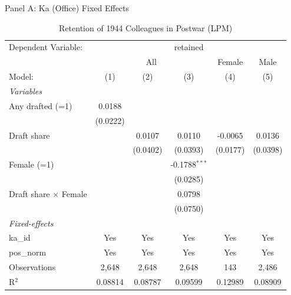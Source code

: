 \begin{table}[htbp]
\centering
\begin{threeparttable}
\caption{Retention of 1944 Colleagues in Postwar (LPM)}
\label{tab:retention}
\small
Panel A: Ka (Office) Fixed Effects\\[1ex]
\begingroup
\centering
\begin{tabular}{lccccc}
   \tabularnewline \midrule \midrule
   Dependent Variable: & \multicolumn{5}{c}{retained}\\
    & \multicolumn{3}{c}{All} & Female & Male \\ 
   Model:                       & (1)      & (2)      & (3)             & (4)      & (5)\\  
   \midrule
   \emph{Variables}\\
   Any drafted (=1)             & 0.0188   &          &                 &          &   \\   
                                & (0.0222) &          &                 &          &   \\   
   Draft share                  &          & 0.0107   & 0.0110          & -0.0065  & 0.0136\\   
                                &          & (0.0402) & (0.0393)        & (0.0177) & (0.0398)\\   
   Female (=1)                  &          &          & -0.1788$^{***}$ &          &   \\   
                                &          &          & (0.0285)        &          &   \\   
   Draft share $\times$ Female  &          &          & 0.0798          &          &   \\   
                                &          &          & (0.0750)        &          &   \\   
   \midrule
   \emph{Fixed-effects}\\
   ka\_id                       & Yes      & Yes      & Yes             & Yes      & Yes\\  
   pos\_norm                    & Yes      & Yes      & Yes             & Yes      & Yes\\  
   \midrule
   Observations                 & 2,648    & 2,648    & 2,648           & 143      & 2,486\\  
   R$^2$                        & 0.08814  & 0.08787  & 0.09599         & 0.12989  & 0.08909\\  
   \midrule \midrule
\end{tabular}

\end{threeparttable}
\end{table}
